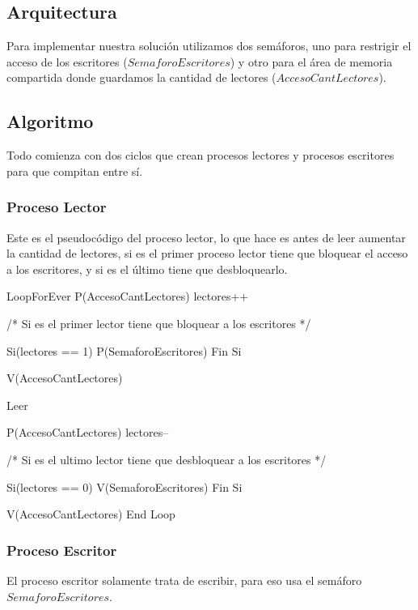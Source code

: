 \subsection{Arquitectura}
Para implementar nuestra soluci\'on utilizamos dos sem\'aforos, uno para restrigir el acceso
de los escritores ($SemaforoEscritores$) y otro para el \'area de memoria compartida donde guardamos la 
cantidad de lectores ($AccesoCantLectores$).

\subsection{Algoritmo}
Todo comienza con dos ciclos que crean procesos lectores y procesos escritores para que compitan entre s\'i.

\subsubsection{Proceso Lector}
Este es el pseudoc\'odigo del proceso lector, lo que hace es antes de leer aumentar la cantidad de lectores, si es
el primer proceso lector tiene que bloquear el acceso a los escritores, y si es el \'ultimo tiene que desbloquearlo.

\begin{scriptsize} 
\begin{verbatimtab} 
	
    LoopForEver
        P(AccesoCantLectores)
            lectores++

                /* Si es el primer lector tiene que bloquear a los escritores  */
            
                Si(lectores == 1)
                   P(SemaforoEscritores)
                Fin Si
        
        V(AccesoCantLectores)

        Leer
        
        P(AccesoCantLectores)
            lectores--
                
                /* Si es el ultimo lector tiene que desbloquear a los escritores  */
                
                Si(lectores == 0)
                   V(SemaforoEscritores)
                Fin Si

        V(AccesoCantLectores)
    End Loop

\end{verbatimtab}
\end{scriptsize}


\subsubsection{Proceso Escritor}
El proceso escritor solamente trata de escribir, para eso usa el sem\'aforo $SemaforoEscritores$.


